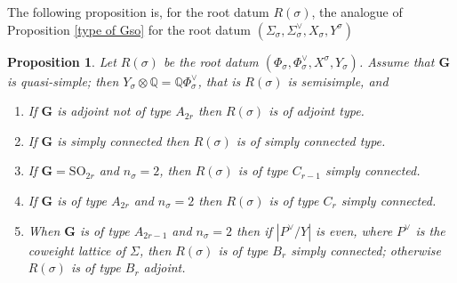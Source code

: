 \documentclass{amsart}
\newtheorem{proposition}[equation]{Proposition}
\numberwithin{equation}{section}
\theoremstyle{definition}
\theoremstyle{remark}
\newcommand\bG{{\mathbf G}}
\newcommand\BQ{{\mathbb Q}}
\newcommand\SO{\mathrm{SO}}
\begin{document}
The following proposition is, for the root datum 
$R(\sigma)$, the analogue  of Proposition \ref{type of Gso} for
the root datum $(\Sigma_\sigma,\Sigma^\vee_\sigma,X_\sigma,Y^\sigma)$
\begin{proposition}\label{R(sigma)}
Let $R(\sigma)$ be the root datum
$(\Phi_\sigma,\Phi^\vee_\sigma,X^\sigma,Y_\sigma)$. 
Assume that $\bG$ is quasi-simple; then
$Y_\sigma\otimes\BQ=\BQ\Phi^\vee_\sigma$,  that is $R(\sigma)$ is
semisimple, and
\begin{enumerate}
\item  If $\bG$ is  adjoint not of type $A_{2r}$ then $R(\sigma)$ is of adjoint type.
\item  If $\bG$ is  simply connected then $R(\sigma)$ is
of simply connected type.
\item If $\bG=\SO_{2r}$ and $n_\sigma=2$, then $R(\sigma)$ is of type $C_{r-1}$
simply connected.
\item If $\bG$ is of type $A_{2r}$ and $n_\sigma=2$
then $R(\sigma)$ is of type  $C_r$ simply connected.
\item When $\bG$ is of type $A_{2r-1}$ and $n_\sigma=2$ then if $|P^\vee/Y|$ is even,
where $P^\vee$ is the coweight lattice of $\Sigma$, then
$R(\sigma)$ is of type $B_r$ simply connected; otherwise $R(\sigma)$ is of type $B_r$ adjoint.
\end{enumerate}
\end{proposition}
\end{document}
